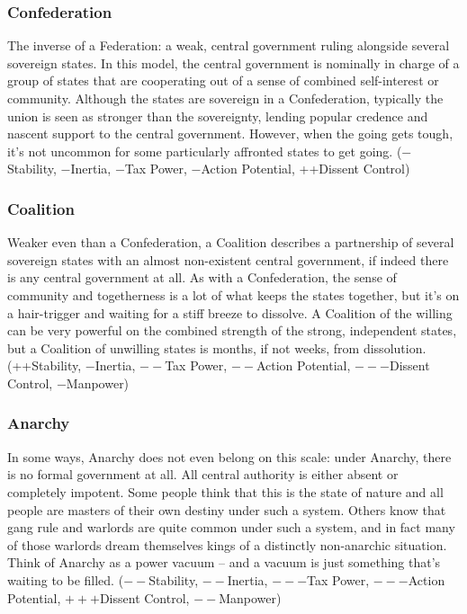 \documentclass[11 pt]{scrartcl}
\begin{document}
\subsubsection*{Confederation}

The inverse of a Federation: a weak, central government ruling alongside several sovereign states. In this model, the central government is nominally in charge of a group of states that are cooperating out of a sense of combined self-interest or community. Although the states are sovereign in a Confederation, typically the union is seen as stronger than the sovereignty, lending popular credence and nascent support to the central government. However, when the going gets tough, it’s not uncommon for some particularly affronted states to get going. ($-$Stability, $-$Inertia, $-$Tax Power, $-$Action Potential, ++Dissent Control)

\subsubsection*{Coalition}

Weaker even than a Confederation, a Coalition describes a partnership of several sovereign states with an almost non-existent central government, if indeed there is any central government at all. As with a Confederation, the sense of community and togetherness is a lot of what keeps the states together, but it’s on a hair-trigger and waiting for a stiff breeze to dissolve. A Coalition of the willing can be very powerful on the combined strength of the strong, independent states, but a Coalition of unwilling states is months, if not weeks, from dissolution. (++Stability, $-$Inertia, $--$Tax Power, $--$Action Potential, $---$Dissent Control, $-$Manpower)

\subsubsection*{Anarchy}

In some ways, Anarchy does not even belong on this scale: under Anarchy, there is no formal government at all. All central authority is either absent or completely impotent. Some people think that this is the state of nature and all people are masters of their own destiny under such a system. Others know that gang rule and warlords are quite common under such a system, and in fact many of those warlords dream themselves kings of a distinctly non-anarchic situation. Think of Anarchy as a power vacuum – and a vacuum is just something that’s waiting to be filled. ($--$Stability, $--$Inertia, $---$Tax Power, $---$Action Potential, $+++$Dissent Control, $--$Manpower)
\end{document}
